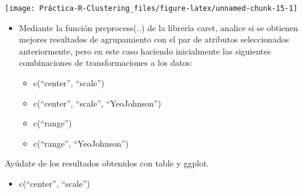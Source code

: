 \documentclass[]{article}
\newenvironment{Shaded}{\begin{snugshade}}{\end{snugshade}}
\newcommand{\CommentTok}[1]{\textcolor[rgb]{0.56,0.35,0.01}{\textit{#1}}}
\newcommand{\DataTypeTok}[1]{\textcolor[rgb]{0.13,0.29,0.53}{#1}}
\newcommand{\DecValTok}[1]{\textcolor[rgb]{0.00,0.00,0.81}{#1}}
\newcommand{\KeywordTok}[1]{\textcolor[rgb]{0.13,0.29,0.53}{\textbf{#1}}}
\newcommand{\NormalTok}[1]{#1}
\newcommand{\OperatorTok}[1]{\textcolor[rgb]{0.81,0.36,0.00}{\textbf{#1}}}
\newcommand{\StringTok}[1]{\textcolor[rgb]{0.31,0.60,0.02}{#1}}
\providecommand{\tightlist}{%
  \setlength{\itemsep}{0pt}\setlength{\parskip}{0pt}}
\begin{document}
\begin{center}\texttt{[image: Práctica-R-Clustering\_files/figure-latex/unnamed-chunk-15-1]} \end{center}

\begin{itemize}
\item
  Mediante la función preprocess(..) de la librería caret, analice si se
  obtienen mejores resultados de agrupamiento con el par de atributos
  seleccionados anteriormente, pero en este caso haciendo inicialmente
  las siguientes combinaciones de transformaciones a los datos:

  \begin{itemize}
  \tightlist
  \item
    c(``center'', ``scale'')
  \item
    c(``center'', ``scale'', ``YeoJohnson'')
  \item
    c(``range'')
  \item
    c(``range'', ``YeoJohnson'')
  \end{itemize}
\end{itemize}

Ayúdate de los resultados obtenidos con table y ggplot.

\begin{itemize}
\tightlist
\item
  c(``center'', ``scale'')
\end{itemize}

\begin{Shaded}
\end{Shaded}
\end{document}
